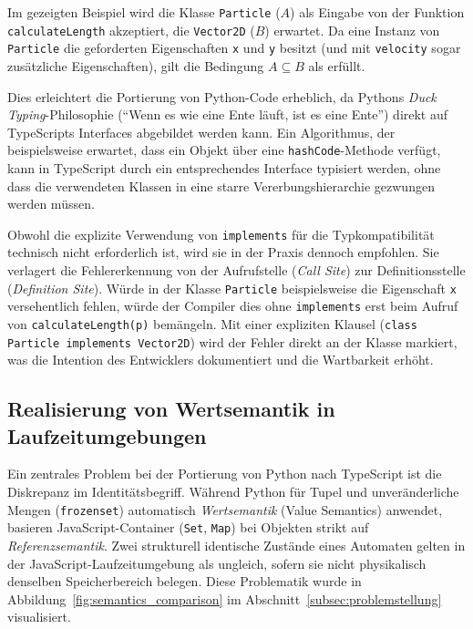 Im gezeigten Beispiel wird die Klasse \texttt{Particle} ($A$) als Eingabe von der Funktion \texttt{calculateLength} akzeptiert, die \texttt{Vector2D} ($B$) erwartet. Da eine Instanz von \texttt{Particle} die geforderten Eigenschaften \texttt{x} und \texttt{y} besitzt (und mit \texttt{velocity} sogar zusätzliche Eigenschaften), gilt die Bedingung $A \subseteq B$ als erfüllt.

Dies erleichtert die Portierung von Python-Code erheblich, da Pythons \emph{Duck Typing}-Philosophie (\enquote{Wenn es wie eine Ente läuft, ist es eine Ente}) direkt auf TypeScripts Interfaces abgebildet werden kann. Ein Algorithmus, der beispielsweise erwartet, dass ein Objekt über eine \texttt{hashCode}-Methode verfügt, kann in TypeScript durch ein entsprechendes Interface typisiert werden, ohne dass die verwendeten Klassen in eine starre Vererbungshierarchie gezwungen werden müssen.

Obwohl die explizite Verwendung von \texttt{implements} für die Typkompatibilität technisch nicht erforderlich ist, wird sie in der Praxis dennoch empfohlen. Sie verlagert die Fehlererkennung von der Aufrufstelle (\emph{Call Site}) zur Definitionsstelle (\emph{Definition Site}). Würde in der Klasse \texttt{Particle} beispielsweise die Eigenschaft \texttt{x} versehentlich fehlen, würde der Compiler dies ohne \texttt{implements} erst beim Aufruf von \texttt{calculateLength(p)} bemängeln. Mit einer expliziten Klausel (\texttt{class Particle implements Vector2D}) wird der Fehler direkt an der Klasse markiert, was die Intention des Entwicklers dokumentiert und die Wartbarkeit erhöht.

\subsection{Realisierung von Wertsemantik in Laufzeitumgebungen}
\label{subsec:value_semantics_impl}

Ein zentrales Problem bei der Portierung von Python nach TypeScript ist die Diskrepanz im Identitätsbegriff. Während Python für Tupel und unveränderliche Mengen (\texttt{frozenset}) automatisch \emph{Wertsemantik} (Value Semantics) anwendet, basieren JavaScript-Container (\texttt{Set}, \texttt{Map}) bei Objekten strikt auf \emph{Referenzsemantik}. Zwei strukturell identische Zustände eines Automaten gelten in der JavaScript-Laufzeitumgebung als ungleich, sofern sie nicht physikalisch denselben Speicherbereich belegen. Diese Problematik wurde in Abbildung~\ref{fig:semantics_comparison} im Abschnitt~\ref{subsec:problemstellung} visualisiert.

